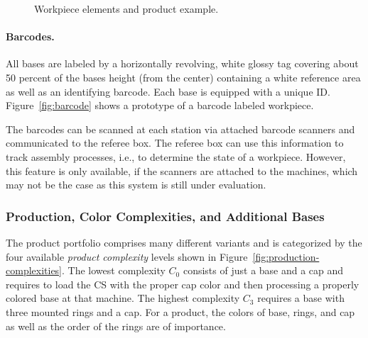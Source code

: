 \documentclass[12pt,twoside]{article}
\newcommand{\reffig}[1]{Figure~\ref{#1}}
\begin{document}
\begin{figure}[ht]
  \centering
  \quad
  \quad
  \caption{Workpiece elements and product example.}
  \label{fig:workpieces}
\end{figure}

\paragraph{Barcodes.}
All bases are labeled by a horizontally revolving, white glossy tag
covering about 50 percent of the bases height (from the center)
containing a white reference area as well as an identifying
barcode. Each base is equipped with a unique ID\@. \reffig{fig:barcode}
shows a prototype of a barcode labeled workpiece.

The barcodes can be scanned at each station via attached barcode scanners and
communicated to the referee box.
The referee box can use this information to track assembly
processes, i.e., to determine the state of a workpiece.
However, this feature is only available, if the scanners are attached
to the machines, which may not be the case as this system is still under
evaluation.

\subsubsection{Production, Color Complexities, and Additional Bases}
\label{sec:production-complexities}
The product portfolio comprises many different variants and is
categorized by the four available \emph{product complexity} levels
shown in \reffig{fig:production-complexities}. The lowest complexity
$C_0$ consists of just a base and a cap and requires to load the CS
with the proper cap color and then processing a properly colored base
at that machine. The highest complexity $C_3$ requires a base with
three mounted rings and a cap. For a product, the colors of base,
rings, and cap as well as the order of the rings are of importance.
\end{document}

